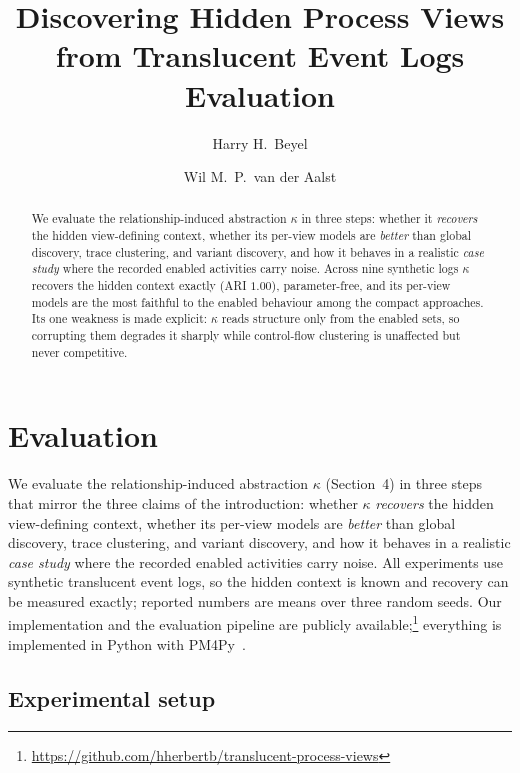\documentclass[10pt]{article}
\title{Discovering Hidden Process Views from Translucent Event Logs\\[2pt]
\large Evaluation}
\author{Harry H.\ Beyel \and Wil M.\ P.\ van der Aalst}
\date{}
\begin{document}
\maketitle
\vspace{-2.2em}

\begin{abstract}
\noindent We evaluate the relationship-induced abstraction $\kappa$ in three steps: whether it \emph{recovers} the hidden view-defining context, whether its per-view models are \emph{better} than global discovery, trace clustering, and variant discovery, and how it behaves in a realistic \emph{case study} where the recorded enabled activities carry noise.
Across nine synthetic logs $\kappa$ recovers the hidden context exactly (ARI $1.00$), parameter-free, and its per-view models are the most faithful to the enabled behaviour among the compact approaches.
Its one weakness is made explicit: $\kappa$ reads structure only from the enabled sets, so corrupting them degrades it sharply while control-flow clustering is unaffected but never competitive.
\end{abstract}

\section{Evaluation}
\label{sec:evaluation}
We evaluate the relationship-induced abstraction $\kappa$ (Section~4) in three steps that mirror the three claims of the introduction: whether $\kappa$ \emph{recovers} the hidden view-defining context, whether its per-view models are \emph{better} than global discovery, trace clustering, and variant discovery, and how it behaves in a realistic \emph{case study} where the recorded enabled activities carry noise.
All experiments use synthetic translucent event logs, so the hidden context is known and recovery can be measured exactly; reported numbers are means over three random seeds.
Our implementation and the evaluation pipeline are publicly available;\footnote{\url{https://github.com/hherbertb/translucent-process-views}} everything is implemented in Python with PM4Py~\cite{vanderaalst2016}.

\subsection{Experimental setup}
\label{sec:setup}
\end{document}

